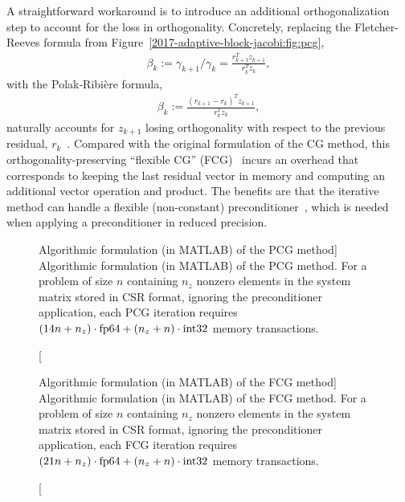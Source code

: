 A straightforward workaround is to introduce an additional orthogonalization
step to account for the loss in orthogonality. Concretely, replacing the
Fletcher-Reeves formula from Figure~\ref{2017-adaptive-block-jacobi:fig:pcg},
\begin{align}
\beta_{k}:=\gamma_{k+1}/\gamma_{k}=\frac{r_{k+1}^T z_{k+1}}{r_{k}^T z_{k}},
\label{2017-adaptive-block-jacobi:eq:fr}
\end{align}
with the Polak-Ribi\`{e}re formula,
\begin{align}
\beta_{k}:=\frac{(r_{k+1}-r_k)^T z_{k+1}}{r_{k}^T z_{k}},
\label{2017-adaptive-block-jacobi:eq:pr}
\end{align}
naturally accounts for $z_{k+1}$ losing orthogonality with respect to the
previous residual, $r_k$~\cite{doi:10.1137/S1064827597323415}. Compared
with the original formulation of the CG method, this
orthogonality-preserving ``flexible CG''
(FCG)~\cite{doi:10.1137/S1064827597323415} incurs an overhead that
corresponds to keeping the last residual vector in memory and computing an
additional vector operation and \dotp product. The benefits are that the
iterative method can handle a flexible (non-constant)
preconditioner~\cite{notay}, which is needed when applying a preconditioner in
reduced precision.

\begin{figure}[t]

\caption
[Algorithmic formulation (in MATLAB) of the PCG method]
{Algorithmic formulation (in MATLAB) of the PCG method.
For a problem of size $n$ containing $n_z$ nonzero elements in the system matrix
stored in CSR format, ignoring the preconditioner application, each PCG
iteration requires $(14n+n_z)\cdot\mbox{\rm fp64}+(n_z+n)\cdot\mbox{\rm int32}$ memory transactions.}
\label{2017-adaptive-block-jacobi:fig:codepcg}
\end{figure}

\begin{figure}[t]

\caption
[Algorithmic formulation (in MATLAB) of the FCG method]
{Algorithmic formulation (in MATLAB) of the FCG method.
For a problem of size $n$ containing $n_z$ nonzero elements in the system matrix
stored in CSR format, ignoring the preconditioner application, each FCG
iteration requires $(21n+n_z)\cdot\mbox{\rm fp64}+(n_z+n)\cdot\mbox{\rm int32}$ memory transactions.}
\label{2017-adaptive-block-jacobi:fig:codefcg}
\end{figure}


